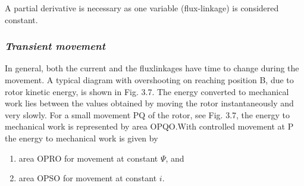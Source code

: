 \documentclass[a4paper,numbers=noenddot,12pt]{scrbook}
\begin{document}
A partial derivative is necessary as one variable (flux-linkage) is considered constant. 
\subsubsection{\textit{Transient movement}} In general, both the current and the flux­linkages have time to change during the movement. A typical diagram with overshooting on reaching position B, due to rotor kinetic energy, is shown in Fig. 3.7. The energy converted to mechanical work lies between the values obtained by moving the rotor instantaneously and very slowly. 
For a small movement PQ of the rotor, see Fig. 3.7, the energy to mechanical work is represented by area OPQO.\@ With controlled movement at P the energy to mechanical work is given by
\begin{enumerate}[label={}]
    \item area OPRO for movement at constant $\varPsi$, and
    \item area OPSO for movement at constant $i$.
\end{enumerate}
\end{document}
